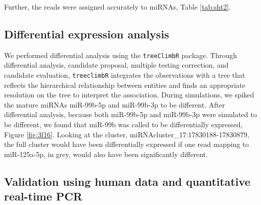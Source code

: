 \documentclass[12pt,twoside]{reedthesis}
\begin{document}
Further, the reads were assigned accurately to miRNAs, Table \ref{tab:sht2}.

\hypertarget{differential-expression-analysis}{%
\subsection{Differential expression analysis}\label{differential-expression-analysis}}

We performed differential analysis using the \texttt{treeClimbR} package. Through
differential analysis, candidate proposal, multiple testing correction,
and candidate evaluation, \texttt{treeclimbR} integrates the observations with a
tree that reflects the hierarchical relationship between entities and
finds an appropriate resolution on the tree to interpret the
association. During simulations, we spiked the mature miRNAs miR-99b-5p
and miR-99b-3p to be different. After differential analysis, because
both miR-99b-5p and miR-99b-3p were simulated to be different, we found
that miR-99b was called to be differentially expressed, Figure \ref{fig:3f16}.
Looking at the cluster, miRNAcluster\_17:17830188-17830879, the full
cluster would have been differentially expressed if one read mapping to
miR-125a-5p, in grey, would also have been significantly different.



\hypertarget{validation-using-human-data-and-quantitative-real-time-pcr}{%
\subsection{Validation using human data and quantitative real-time PCR}\label{validation-using-human-data-and-quantitative-real-time-pcr}}
\end{document}
